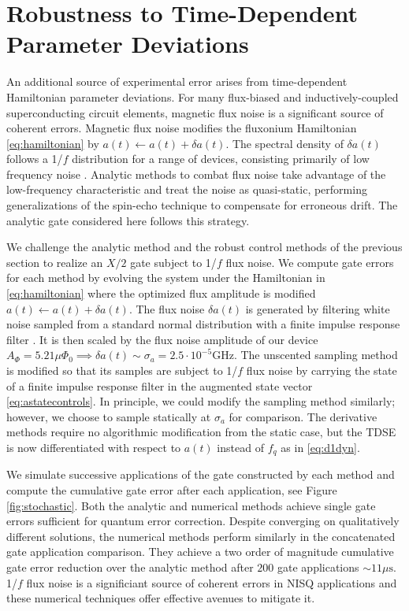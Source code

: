\section{Robustness to Time-Dependent Parameter Deviations \label{sec:stochastic}}
An additional source of experimental error arises from time-dependent
Hamiltonian parameter deviations. For many flux-biased and inductively-coupled
superconducting circuit elements, magnetic flux noise is a significant
source of coherent errors. Magnetic flux noise
modifies the fluxonium Hamiltonian \eqref{eq:hamiltonian}
by $a(t) \gets a(t) + \delta a(t)$.
The spectral density of $\delta a(t)$ follows a
1/$f$ distribution for a range of devices, consisting primarily of low frequency
noise \cite{bialczak20071f, koch2007model,
  yoshihara2006decoherence, yoshihara2010correlated}.
Analytic methods to combat flux noise
take advantage of the low-frequency characteristic and
treat the noise as quasi-static, performing generalizations of the spin-echo technique
to compensate for erroneous drift. The analytic gate considered here
follows this strategy.

We challenge the analytic method and
the robust control
methods of the previous section
to realize an $X/2$ gate subject to 1/$f$ flux noise.
We compute gate errors for each method
by evolving the system under the Hamiltonian in \eqref{eq:hamiltonian}
where the optimized flux amplitude is modified $a(t) \gets a(t) + \delta a(t)$.
The flux noise $\delta a(t)$ is generated by
filtering white noise sampled from a standard normal distribution with a finite
impulse response filter \cite{saspweb2011}.
It is then scaled by the 
flux noise amplitude of our device $A_{\Phi} = 5.21 \mu \Phi_{0} \implies
\delta a (t) \sim \sigma_{a} = 2.5 \cdot 10^{-5} \textrm{GHz}$.
The unscented sampling method is modified so that its samples
are subject to 1/$f$ flux noise by carrying the state of a finite impulse response filter
in the augmented state vector \eqref{eq:astatecontrols}.
In principle, we could modify the sampling method
similarly; however, we choose to sample statically at $\sigma_{a}$ for comparison.
The derivative methods require no algorithmic modification from the static case,
but the TDSE is now differentiated with respect to $a(t)$ instead of $f_{q}$ as
in \eqref{eq:d1dyn}.

We simulate successive applications of the gate constructed by each method
and compute the cumulative gate error
after each application, see Figure \ref{fig:stochastic}.
Both the analytic
and numerical methods achieve single gate errors
sufficient for quantum error correction.
Despite converging on qualitatively different solutions, the
numerical methods perform similarly in the concatenated
gate application comparison. They achieve a two
order of magnitude cumulative gate error reduction over the analytic method after $200$
gate applications $\sim 11 \mu\textrm{s}$.
1/$f$ flux noise is a significiant source of coherent errors in NISQ applications and
these numerical techniques offer effective avenues to mitigate it.
